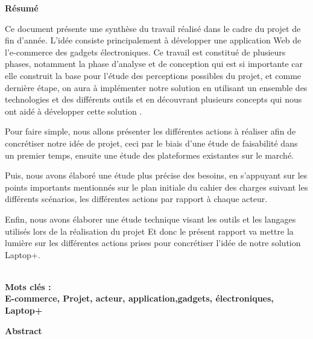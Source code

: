 \documentclass[a4paper]{report}
\begin{document}
\clearpage
{}
\begin{doublespace}
\begin{center}
\vspace*{1cm}

\textbf{\huge{Résumé}}

\end{center}
\end{doublespace}
\begin{doublespace}

Ce document présente une synthèse du travail réalisé  dans le cadre du projet de fin d'année. L'idée consiste principalement à développer  une application Web de l'e-commerce des gadgets électroniques. Ce travail est constitué de plusieurs phases, notamment la phase d’analyse et de conception qui est si importante car elle  construit la base pour l'étude 
des perceptions possibles du projet, et comme dernière étape, on aura à implémenter notre solution en 
utilisant un ensemble des technologies et des différents outils et en découvrant plusieurs concepts  qui nous ont aidé à développer cette solution .

Pour faire simple, nous allons présenter les différentes actions à réaliser afin de concrétiser notre idée de projet, ceci par le biais d’une étude de faisabilité dans un premier temps, ensuite une étude des plateformes existantes sur le marché.

Puis, nous avons élaboré une étude plus précise des besoins, en s’appuyant sur les points importants mentionnés sur le plan initiale du cahier des charges suivant les différents scénarios, les différentes actions par rapport à chaque acteur.

Enfin, nous avons élaborer une étude technique visant les outils et les langages utilisés lors de la réalisation du projet
Et donc le présent rapport va mettre la lumière sur les différentes actions prises pour concrétiser l’idée de notre solution Laptop+. 


\textbf	{\\Mots clés :\\ E-commerce, Projet, acteur, application,gadgets, électroniques, Laptop+ }






\end{doublespace}
\clearpage
{}
\begin{doublespace}
\begin{center}
\vspace*{1cm}

\textbf{\huge{Abstract}}
\end{center}
\end{doublespace}
\end{document}
